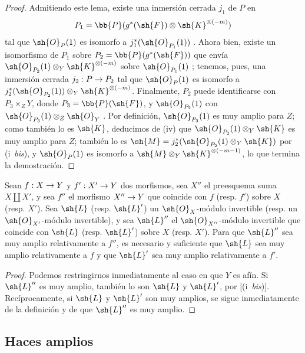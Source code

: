 \documentclass[oneside,10pt]{amsart}
\makeatletter
\newcommand{\ega@arrow}[2]{\mathchoice{#1}{#2}{#2}{#2}}
\renewcommand{\to}{\ega@arrow{\longrightarrow}{\rightarrow}}
\newcommand{\oldpage}[2][]{\marginnote{\normalfont\footnotesize\textbf{#1}~|~#2}\ignorespaces}
\let\EGAOriginalLabel\label
\renewcommand{\label}[1]{\phantomsection\EGAOriginalLabel{#1}}
\makeatother
\begin{document}
\begin{proof}
\oldpage[II]{83}
Admitiendo este lema, existe una inmersión cerrada $j_1$ de $P$ en
\[
  P_1=\bb{P}(g^*(\sh{F})\otimes\sh{K}^{\otimes(-m)})
\]
tal que $\sh{O}_P(1)$ es isomorfo a $j_1^*(\sh{O}_{P_1}(1))$ .
Ahora bien, existe un isomorfismo de $P_1$ sobre $P_2=\bb{P}(g^*(\sh{F}))$ que envía $\sh{O}_{P_2}(1)\otimes_Y\sh{K}^{\otimes(-m)}$ sobre $\sh{O}_{P_1}(1)$ ;
tenemos, pues, una inmersión cerrada $j_2:P\to P_2$ tal que $\sh{O}_P(1)$ es isomorfo a $j_2^*(\sh{O}_{P_2}(1))\otimes_Y\sh{K}^{\otimes(-m)}$.
Finalmente, $P_2$ puede identificarse con $P_3\times_ZY$, donde $P_3=\bb{P}(\sh{F})$, y $\sh{O}_{P_2}(1)$ con $\sh{O}_{P_3}(1)\otimes_Z\sh{O}_Y$ .
Por definición, $\sh{O}_{P_3}(1)$ es muy amplio para $Z$;
como también lo es $\sh{K}$, deducimos de (iv) que $\sh{O}_{P_2}(1)\otimes_Y\sh{K}$ es muy amplio para $Z$;
también lo es $\sh{M}=j_2^*(\sh{O}_{P_2}(1)\otimes_Y\sh{K})$ por (i~\emph{bis}), y $\sh{O}_P(1)$ es isomorfo a $\sh{M}\otimes_Y\sh{K}^{\otimes(-m-1)}$, lo que termina la demostración.
\end{proof}

\begin{proposition}[4.4.11]
\label{II.4.4.11}
Sean $f:X\to Y$ y $f':X'\to Y$ dos morfismos, sea $X''$ el preesquema suma $X\amalg X'$, y sea $f''$ el morfismo $X''\to Y$ que coincide con $f$ \textup{(resp. $f'$)} sobre $X$ \textup{(resp. $X'$)}.
Sea $\sh{L}$ \textup{(resp. $\sh{L}'$)} un $\sh{O}_X$-módulo invertible \textup{(resp.} un $\sh{O}_{X'}$-módulo invertible\textup{)}, y sea $\sh{L}''$ el $\sh{O}_{X''}$-módulo invertible que coincide con $\sh{L}$ (resp. $\sh{L}'$) sobre $X$ (resp. $X'$).
Para que $\sh{L}''$ sea muy amplio relativamente a $f''$, es necesario y suficiente que $\sh{L}$ sea muy amplio relativamente a $f$ y que $\sh{L}'$ sea muy amplio relativamente a $f'$.
\end{proposition}

\begin{proof}
Podemos restringirnos inmediatamente al caso en que $Y$ es afín.
Si $\sh{L}''$ es muy amplio, también lo son $\sh{L}$ y $\sh{L}'$, por [(i~\emph{bis})].
Recíprocamente, si $\sh{L}$ y $\sh{L}'$ son muy amplios, se sigue inmediatamente de la definición  y de  que $\sh{L}''$ es muy amplio.
\end{proof}

\subsection{Haces amplios}
\label{subsection:II.4.5}
\end{document}
